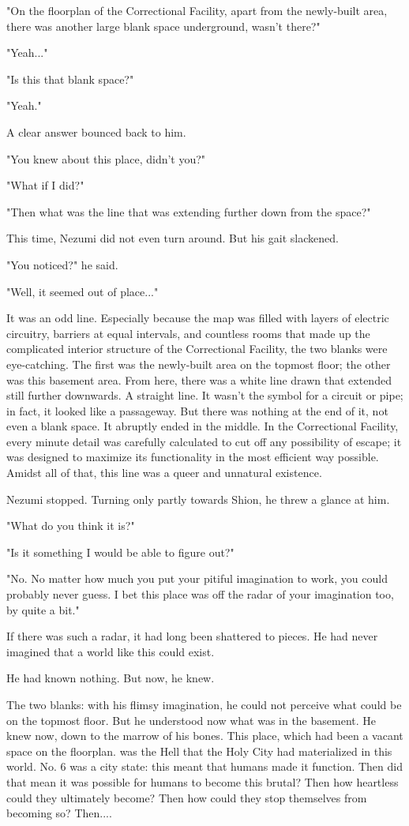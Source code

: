 "On the floorplan of the Correctional Facility, apart from the
newly-built area, there was another large blank space underground,
wasn't there?"

"Yeah..."

"Is this that blank space?"

"Yeah."

A clear answer bounced back to him.

"You knew about this place, didn't you?"

"What if I did?"

"Then what was the line that was extending further down from the space?"

This time, Nezumi did not even turn around. But his gait slackened.

"You noticed?" he said.

"Well, it seemed out of place..."

It was an odd line. Especially because the map was filled with layers of
electric circuitry, barriers at equal intervals, and countless rooms
that made up the complicated interior structure of the Correctional
Facility, the two blanks were eye-catching. The first was the
newly-built area on the topmost floor; the other was this basement area.
From here, there was a white line drawn that extended still further
downwards. A straight line. It wasn't the symbol for a circuit or pipe;
in fact, it looked like a passageway. But there was nothing at the end
of it, not even a blank space. It abruptly ended in the middle. In the
Correctional Facility, every minute detail was carefully calculated to
cut off any possibility of escape; it was designed to maximize its
functionality in the most efficient way possible. Amidst all of that,
this line was a queer and unnatural existence.

Nezumi stopped. Turning only partly towards Shion, he threw a glance at
him.

"What do you think it is?"

"Is it something I would be able to figure out?"

"No. No matter how much you put your pitiful imagination to work, you
could probably never guess. I bet this place was off the radar of your
imagination too, by quite a bit."

If there was such a radar, it had long been shattered to pieces. He had
never imagined that a world like this could exist.

He had known nothing. But now, he knew.

The two blanks: with his flimsy imagination, he could not perceive what
could be on the topmost floor. But he understood now what was in the
basement. He knew now, down to the marrow of his bones. This place,
which had been a vacant space on the floorplan. was the Hell that the
Holy City had materialized in this world. No. 6 was a city state: this
meant that humans made it function. Then did that mean it was possible
for humans to become this brutal? Then how heartless could they
ultimately become? Then how could they stop themselves from becoming so?
Then....

